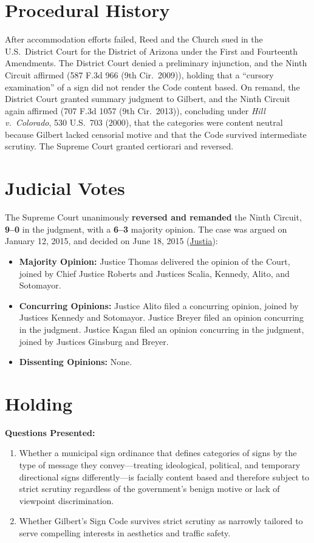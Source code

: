 \documentclass[12pt]{article}
\begin{document}
\section{Procedural History}
After accommodation efforts failed, Reed and the Church sued in the U.S.\ District Court for the District of Arizona under the First and Fourteenth Amendments. The District Court denied a preliminary injunction, and the Ninth Circuit affirmed (587 F.3d 966 (9th Cir.\ 2009)), holding that a ``cursory examination'' of a sign did not render the Code content based. On remand, the District Court granted summary judgment to Gilbert, and the Ninth Circuit again affirmed (707 F.3d 1057 (9th Cir.\ 2013)), concluding under \textit{Hill v.\ Colorado}, 530 U.S.\ 703 (2000), that the categories were content neutral because Gilbert lacked censorial motive and that the Code survived intermediate scrutiny. The Supreme Court granted certiorari and reversed.

\section{Judicial Votes}
The Supreme Court unanimously \textbf{reversed and remanded} the Ninth Circuit, \textbf{9--0} in the judgment, with a \textbf{6--3} majority opinion. The case was argued on January 12, 2015, and decided on June 18, 2015 (\href{https://supreme.justia.com/cases/federal/us/576/155/}{Justia}):

\begin{itemize}
    \item \textbf{Majority Opinion:} Justice Thomas delivered the opinion of the Court, joined by Chief Justice Roberts and Justices Scalia, Kennedy, Alito, and Sotomayor.
    \item \textbf{Concurring Opinions:} Justice Alito filed a concurring opinion, joined by Justices Kennedy and Sotomayor. Justice Breyer filed an opinion concurring in the judgment. Justice Kagan filed an opinion concurring in the judgment, joined by Justices Ginsburg and Breyer.
    \item \textbf{Dissenting Opinions:} None.
\end{itemize}

\section{Holding}
\textbf{Questions Presented:}

\begin{enumerate}
  \item Whether a municipal sign ordinance that defines categories of signs by the type of message they convey---treating ideological, political, and temporary directional signs differently---is facially content based and therefore subject to strict scrutiny regardless of the government's benign motive or lack of viewpoint discrimination.
  \item Whether Gilbert's Sign Code survives strict scrutiny as narrowly tailored to serve compelling interests in aesthetics and traffic safety.
\end{enumerate}
\end{document}
